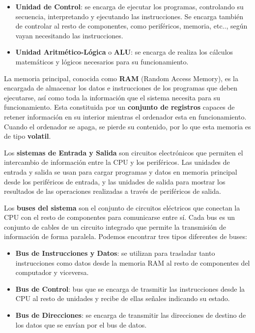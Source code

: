 \begin{itemize}
    \item \textbf{Unidad de Control}: se encarga de ejecutar los programas, controlando su secuencia, interpretando y ejecutando las instrucciones. Se encarga también de controlar al resto de componentes, como periféricos, memoria, etc.., según vayan necesitando las instrucciones.
    \item \textbf{Unidad Aritmético-Lógica} o \textbf{ALU}: se encarga de realiza los cálculos matemáticos y lógicos necesarios para su funcionamiento.
\end{itemize}

La memoria principal, conocida como \textbf{RAM} (Random Access Memory), es la encargada de almacenar los datos e instrucciones de los programas que deben ejecutarse, así como toda la información que el sistema necesita para su funcionamiento. Esta constituida por un \textbf{conjunto de registros} capaces de retener información en su interior mientras el ordenador esta en funcionamiento. Cuando el ordenador se apaga, se pierde su contenido, por lo que esta memoria es de tipo \textbf{\gls{volatil}}.

Los \textbf{sistemas de Entrada y Salida} son circuitos electrónicos que permiten el intercambio de información entre la CPU y los periféricos. Las unidades de entrada y salida se usan para cargar programas y datos en memoria principal desde los periféricos de entrada, y las unidades de salida para mostrar los resultados de las operaciones realizadas a través de periféricos de salida.

Los \textbf{buses del sistema} son el conjunto de circuitos eléctricos que conectan la CPU con el resto de componentes para comunicarse entre sí. Cada bus es un conjunto de cables de un circuito integrado que permite la transmisión de información de forma paralela. Podemos encontrar tres tipos diferentes de buses:

\begin{itemize}
    \item \textbf{Bus de Instrucciones y Datos}: se utilizan para trasladar tanto instrucciones como datos desde la memoria RAM al resto de componentes del computador y viceversa.
    \item \textbf{Bus de Control}: bus que se encarga de trasmitir las instrucciones desde la CPU al resto de unidades y recibe de ellas señales indicando su estado.
    \item \textbf{Bus de Direcciones}: se encarga de transmitir las direcciones de destino de los datos que se envían por el bus de datos.
\end{itemize}

